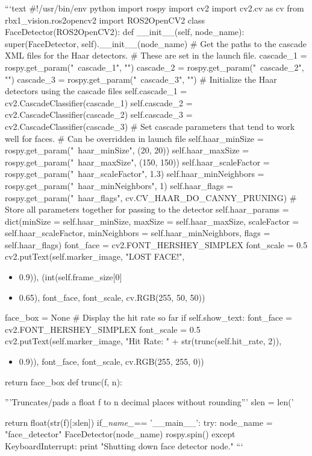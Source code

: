 ```text
#!/usr/bin/env python
import rospy
import cv2
import cv2.cv as cv
from rbx1_vision.ros2opencv2 import ROS2OpenCV2
class FaceDetector(ROS2OpenCV2):
def __init__(self, node_name):
super(FaceDetector, self).__init__(node_name)
# Get the paths to the cascade XML files for the Haar detectors.
# These are set in the launch file.
cascade_1 = rospy.get_param("~cascade_1", "")
cascade_2 = rospy.get_param("~cascade_2", "")
cascade_3 = rospy.get_param("~cascade_3", "")
# Initialize the Haar detectors using the cascade files
self.cascade_1 = cv2.CascadeClassifier(cascade_1)
self.cascade_2 = cv2.CascadeClassifier(cascade_2)
self.cascade_3 = cv2.CascadeClassifier(cascade_3)
# Set cascade parameters that tend to work well for faces.
# Can be overridden in launch file
self.haar_minSize = rospy.get_param("~haar_minSize", (20, 20))
self.haar_maxSize = rospy.get_param("~haar_maxSize", (150, 150))
self.haar_scaleFactor = rospy.get_param("~haar_scaleFactor", 1.3)
self.haar_minNeighbors = rospy.get_param("~haar_minNeighbors", 1)
self.haar_flags = rospy.get_param("~haar_flags",
cv.CV_HAAR_DO_CANNY_PRUNING) 
# Store all parameters together for passing to the detector
self.haar_params = dict(minSize = self.haar_minSize, maxSize = self.haar_maxSize,
scaleFactor = self.haar_scaleFactor, minNeighbors = self.haar_minNeighbors, flags = self.haar_flags)
font_face = cv2.FONT_HERSHEY_SIMPLEX
font_scale = 0.5
cv2.putText(self.marker_image, "LOST FACE!",
\begin{itemize} 
int(self.frame_size[1] \item { 0.9)), } 
(int(self.frame_size[0] \item { 0.65), font_face, font_scale, cv.RGB(255, 50, 50))} 
\end{itemize} 
face_box = None
        # Display the hit rate so far
if self.show_text:
font_face = cv2.FONT_HERSHEY_SIMPLEX font_scale = 0.5 cv2.putText(self.marker_image, "Hit Rate: " +
str(trunc(self.hit_rate, 2)),
\begin{itemize} 
(20, int(self.frame_size[1] \item { 0.9)), font_face, font_scale, cv.RGB(255, 255, 0))} 
\end{itemize} 
    return face_box
def trunc(f, n):
\begin{itemize} 
'''Truncates/pads a float f to n decimal places without rounding''' slen = len('%
\end{itemize} 
return float(str(f)[:slen])
if\textit{_name_}== '__main__': try:
node_name = "face_detector" FaceDetector(node_name) rospy.spin()
except KeyboardInterrupt:
print "Shutting down face detector node."
```

